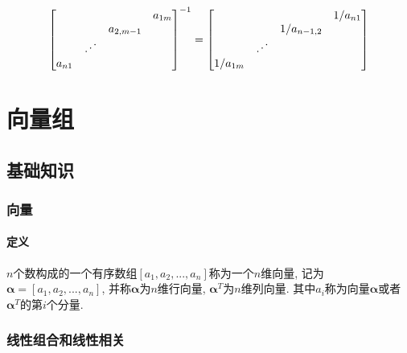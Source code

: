\begin{enumerate}
\begin{enumerate}
\begin{enumerate}
\begin{equation*}
\begin{bmatrix}
& & & a_{1m} \\
& & a_{2,m-1} & \\
& \reflectbox{$\ddots$} & & \\
a_{n1} & & &
\end{bmatrix}^{-1}=
\begin{bmatrix}
& & & 1/a_{n1} \\
& & 1/a_{n-1,2} & \\
& \reflectbox{$\ddots$} & & \\
1/a_{1m}& & &
\end{bmatrix}
\end{equation*}
\end{enumerate}
\end{enumerate}
\end{enumerate}
\chapter{向量组}
\section{基础知识}
\subsection{向量}
\subsubsection{定义}
$ n $个数构成的一个有序数组$ [a_{1},a_{2},...,a_{n}] $称为一个$ n $维向量, 记为$ \bm{\alpha} = [a_{1},a_{2},...,a_{n}] $, 并称$ \bm{\alpha} $为$ n $维行向量, $ \bm{\alpha}^{T} $为$ n $维列向量. 其中$ a_{i} $称为向量$ \bm{\alpha} $或者$ \bm{\alpha}^{T} $的第$ i $个分量.
\subsection{线性组合和线性相关}
